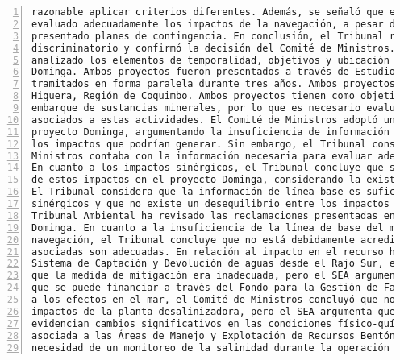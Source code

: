 \begin{Verbatim}[frame=lines, label=Elavoración propia -  Ejemplo de Contexto enviado por el Chatbot a OpenAI
				, fontsize=\scriptsize, numbers=left
				, baselinestretch=0.4
				, formatcom=\color{gray}]
razonable aplicar criterios diferentes. Además, se señaló que el proyecto Dominga no había
evaluado adecuadamente los impactos de la navegación, a pesar de haber identificado riesgos y
presentado planes de contingencia. En conclusión, el Tribunal rechazó la alegación de trato
discriminatorio y confirmó la decisión del Comité de Ministros.\nEl Tribunal Ambiental ha
analizado los elementos de temporalidad, objetivos y ubicación de los proyectos Cruz Grande y
Dominga. Ambos proyectos fueron presentados a través de Estudios de Impacto Ambiental y fueron
tramitados en forma paralela durante tres años. Ambos proyectos se ubican en la comuna de La
Higuera, Región de Coquimbo. Ambos proyectos tienen como objetivo la recepción, acopio y
embarque de sustancias minerales, por lo que es necesario evaluar los impactos ambientales
asociados a estas actividades. El Comité de Ministros adoptó un actuar distinto respecto al
proyecto Dominga, argumentando la insuficiencia de información sobre las rutas de navegación y
los impactos que podrían generar. Sin embargo, el Tribunal considera que el Comité de
Ministros contaba con la información necesaria para evaluar adecuadamente el proyecto Dominga.
En cuanto a los impactos sinérgicos, el Tribunal concluye que se realizó un análisis completo
de estos impactos en el proyecto Dominga, considerando la existencia del proyecto Cruz Grande.
El Tribunal considera que la información de línea base es suficiente para definir los impactos
sinérgicos y que no existe un desequilibrio entre los impactos y las medidas propuestas.\nEl
Tribunal Ambiental ha revisado las reclamaciones presentadas en relación al proyecto minero
Dominga. En cuanto a la insuficiencia de la línea de base del medio marino en las rutas de
navegación, el Tribunal concluye que no está debidamente acreditada y que las medidas
asociadas son adecuadas. En relación al impacto en el recurso hídrico por el cierre del
Sistema de Captación y Devolución de aguas desde el Rajo Sur, el Comité de Ministros consideró
que la medida de mitigación era inadecuada, pero el SEA argumenta que la medida es idónea y
que se puede financiar a través del Fondo para la Gestión de Faenas Mineras Cerradas. Respecto
a los efectos en el mar, el Comité de Ministros concluyó que no se evaluaron adecuadamente los
impactos de la planta desalinizadora, pero el SEA argumenta que sí se evaluaron y que no se
evidencian cambios significativos en las condiciones físico-químicas ni en la biodiversidad
asociada a las Áreas de Manejo y Explotación de Recursos Bentónicos. Además, se establece la
necesidad de un monitoreo de la salinidad durante la operación del proyecto. En conclusión, el

\end{Verbatim}

